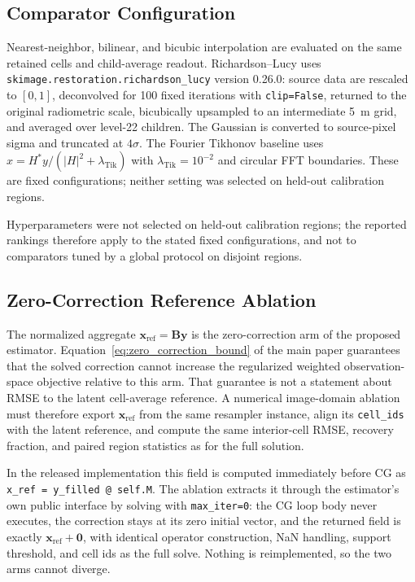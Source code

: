 \documentclass[journal]{IEEEtran}
\begin{document}
\subsection{Comparator Configuration}

Nearest-neighbor, bilinear, and bicubic interpolation are evaluated on the
same retained cells and child-average readout. Richardson--Lucy uses
\texttt{skimage.restoration.richardson\_lucy} version 0.26.0: source data are
rescaled to $[0,1]$, deconvolved for 100 fixed iterations with
\texttt{clip=False}, returned to the original radiometric scale, bicubically
upsampled to an intermediate 5~m grid, and averaged over level-22 children.
The Gaussian is converted to source-pixel sigma and truncated at $4\sigma$.
The Fourier Tikhonov baseline uses
$\widehat x=H^*y/(|H|^2+\lambda_{\mathrm{Tik}})$ with
$\lambda_{\mathrm{Tik}}=10^{-2}$ and circular FFT boundaries. These are
fixed configurations; neither setting was selected on held-out calibration
regions.

Hyperparameters were not selected on held-out calibration regions; the
reported rankings therefore apply to the stated fixed configurations, and
not to comparators tuned by a global protocol on disjoint regions.

\subsection{Zero-Correction Reference Ablation}
\label{supp:xref_ablation}

The normalized aggregate $\mathbf x_{\mathrm{ref}}=\mathbf B\mathbf y$ is the
zero-correction arm of the proposed estimator. Equation~\eqref{eq:zero_correction_bound}
of the main paper guarantees that the solved correction cannot increase the
regularized weighted observation-space objective relative to this arm. That
guarantee is not a statement about RMSE to the latent cell-average reference.
A numerical image-domain ablation must therefore export
$\mathbf x_{\mathrm{ref}}$ from the same resampler instance, align its
\texttt{cell\_ids} with the latent reference, and compute the same interior-cell
RMSE, recovery fraction, and paired region statistics as for the full
solution.

In the released implementation this field is computed immediately before CG
as \texttt{x\_ref = y\_filled @ self.M}. The ablation extracts it through
the estimator's own public interface by solving with \texttt{max\_iter=0}:
the CG loop body never executes, the correction stays at its zero initial
vector, and the returned field is exactly
$\mathbf x_{\mathrm{ref}} + \mathbf 0$, with identical operator
construction, NaN handling, support threshold, and cell ids as the full
solve. Nothing is reimplemented, so the two arms cannot diverge.
\end{document}
